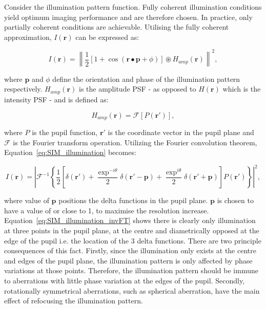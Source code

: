 Consider the illumination pattern function. Fully coherent
illumination conditions yield optimum imaging performance and
are therefore chosen. In practice, only partially coherent 
conditions are achievable. Utilising the fully coherent 
approximation, $I(\textbf{r})$ can be expressed as:

\begin{equation}\label{eq:SIM_illumination}
I(\textbf{r}) = \left\| \frac{1}{2}[1 + \cos(\textbf{r}\bullet\textbf{p} + \phi)]\circledast H_{amp}(\textbf{r}) \right\|^{2},
\end{equation}

where $\textbf{p}$ and $\phi$ define the orientation and phase of
the illumination pattern respectively. $H_{amp}(\textbf{r})$ is the
amplitude PSF - as opposed to $H(\textbf{r})$ which is the intensity
PSF - and is defined as:

\begin{equation}\label{eq:amplitude_PSF}
H_{amp}(\textbf{r}) = \mathcal{F}[P(\textbf{r}')],
\end{equation}

where $P$ is the pupil function, $\textbf{r}'$ is the coordinate
vector in the pupil plane and $\mathcal{F}$ is the Fourier
transform operation. Utilizing the Fourier convolution 
theorem, Equation~\ref{eq:SIM_illumination} becomes:

\begin{equation}\label{eq:SIM_illumination_invFT}
I(\textbf{r}) = \left| \mathcal{F}^{-1}\left\{\frac{1}{2}\left[\delta(\textbf{r}') + \frac{\exp^{-i\theta}}{2}\delta(\textbf{r}'-\textbf{p}) + \frac{\exp^{i\theta}}{2}\delta(\textbf{r}'+\textbf{p})\right]P(\textbf{r}')\right\} \right|^{2},
\end{equation}

where value of $\textbf{p}$ positions the delta functions in the
pupil plane. $\textbf{p}$ is chosen to have a value of or close
to 1, to maximise the resolution increase. 
Equation~\ref{eq:SIM_illumination_invFT} shows there is clearly only
illumination at three points in the pupil plane, at the centre 
and diametrically opposed at the edge of the pupil i.e. the location 
of the 3 delta functions. There are two principle consequences of 
this fact. Firstly, since the illumination only exists at the centre 
and edges of the pupil plane, the illumination pattern is only 
affected by phase variations at those points. Therefore, the 
illumination pattern should be immune to aberrations with little phase variation at the edges of the pupil. Secondly, rotationally symmetrical 
aberrations, such as spherical aberration, have the main
effect of refocusing the illumination pattern\cite{booth2015aberrations}.

